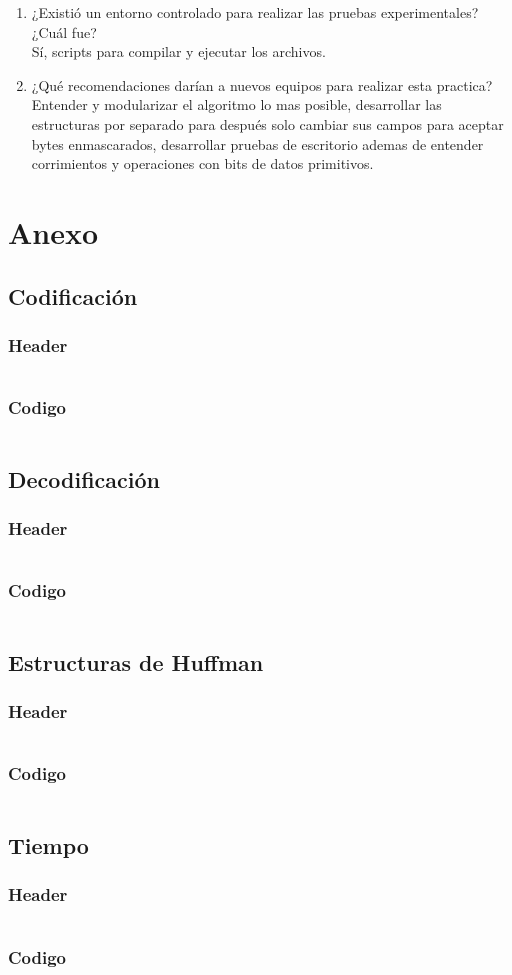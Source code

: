 \documentclass[12 pt]{report}
\begin{document}
\begin{enumerate}
\begin{itemize}
  \end{itemize}
\item ¿Existió un entorno controlado para realizar las pruebas experimentales? ¿Cuál fue?\\
  Sí, scripts para compilar y ejecutar los archivos.
\item ¿Qué recomendaciones darían a nuevos equipos para realizar esta practica?\\
  Entender y modularizar el algoritmo lo mas posible, desarrollar las estructuras por separado para después solo cambiar sus campos para aceptar bytes enmascarados, desarrollar pruebas de escritorio ademas de entender corrimientos y operaciones con bits de datos primitivos.
\end{enumerate}
\chapter{Anexo}
\section{Codificación}
\subsection{Header}
\inputminted{C}{../CompressHuffman.h}
\subsection{Codigo}
\inputminted{C}{../CompressHuffman.c}

\section{Decodificación}
\subsection{Header}
\inputminted{C}{../DecompressHuffman.h}
\subsection{Codigo}
\inputminted{C}{../DecompressHuffman.c}

\section{Estructuras de Huffman}
\subsection{Header}
\inputminted{C}{../HuffmanStructures.h}
\subsection{Codigo}
\inputminted{C}{../HuffmanStructures.c}

\section{Tiempo}
\subsection{Header}
\inputminted{C}{../tiempo.h}
\subsection{Codigo}
\inputminted{C}{../tiempo.c}
\end{document}
